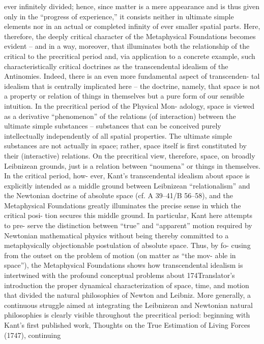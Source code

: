 ever inﬁnitely divided; hence, since matter is a mere appearance and is
thus given only in the “progress of experience,” it consists neither in
ultimate simple elements nor in an actual or completed inﬁnity of ever
smaller spatial parts. Here, therefore, the deeply critical character of the
Metaphysical Foundations becomes evident – and in a way, moreover, that
illuminates both the relationship of the critical to the precritical period
and, via application to a concrete example, such characteristically critical
doctrines as the transcendental idealism of the Antinomies.
Indeed, there is an even more fundamental aspect of transcenden-
tal idealism that is centrally implicated here – the doctrine, namely, that
space is not a property or relation of things in themselves but a pure form
of our sensible intuition. In the precritical period of the Physical Mon-
adology, space is viewed as a derivative “phenomenon” of the relations (of
interaction) between the ultimate simple substances – substances that can
be conceived purely intellectually independently of all spatial properties.
The ultimate simple substances are not actually in space; rather, space
itself is ﬁrst constituted by their (interactive) relations. On the precritical
view, therefore, space, on broadly Leibnizean grounds, just is a relation
between “noumena” or things in themselves. In the critical period, how-
ever, Kant’s transcendental idealism about space is explicitly intended as a
middle ground between Leibnizean “relationalism” and the Newtonian
doctrine of absolute space (cf. A 39–41/B 56–58), and the Metaphysical
Foundations greatly illuminates the precise sense in which the critical posi-
tion secures this middle ground. In particular, Kant here attempts to pre-
serve the distinction between “true” and “apparent” motion required by
Newtonian mathematical physics without being thereby committed to a
metaphysically objectionable postulation of absolute space. Thus, by fo-
cusing from the outset on the problem of motion (on matter as “the mov-
able in space”), the Metaphysical Foundations shows how transcendental
idealism is intertwined with the profound conceptual problems about
174Translator’s introduction
the proper dynamical characterization of space, time, and motion that
divided the natural philosophies of Newton and Leibniz.
More generally, a continuous struggle aimed at integrating the
Leibnizean and Newtonian natural philosophies is clearly visible
throughout the precritical period: beginning with Kant’s ﬁrst published
work, Thoughts on the True Estimation of Living Forces (1747), continuing
